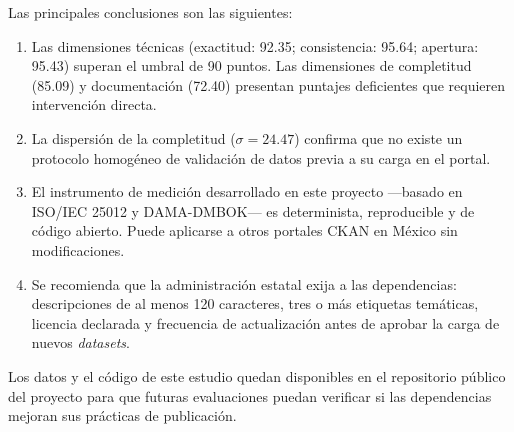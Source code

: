 \documentclass[12pt,letterpaper]{article}
\begin{document}
Las principales conclusiones son las siguientes:

\begin{enumerate}
  \item Las dimensiones t\'ecnicas (exactitud: 92.35; consistencia: 95.64;
    apertura: 95.43) superan el umbral de 90 puntos. Las dimensiones de
    completitud (85.09) y documentaci\'on (72.40) presentan puntajes
    deficientes que requieren intervenci\'on directa.
  \item La dispersi\'on de la completitud ($\sigma = 24.47$) confirma que
    no existe un protocolo homog\'eneo de validaci\'on de datos previa a su
    carga en el portal.
  \item El instrumento de medici\'on desarrollado en este proyecto ---basado
    en ISO/IEC 25012 y DAMA-DMBOK--- es determinista, reproducible y de
    c\'odigo abierto. Puede aplicarse a otros portales CKAN en M\'exico
    sin modificaciones.
  \item Se recomienda que la administraci\'on estatal exija a las
    dependencias: descripciones de al menos 120 caracteres, tres o m\'as
    etiquetas tem\'aticas, licencia declarada y frecuencia de actualizaci\'on
    antes de aprobar la carga de nuevos \textit{datasets}.
\end{enumerate}

\noindent Los datos y el c\'odigo de este estudio quedan disponibles en el
repositorio p\'ublico del proyecto para que futuras evaluaciones puedan
verificar si las dependencias mejoran sus pr\'acticas de publicaci\'on.

\printbibliography[title={Referencias}]
\end{document}
